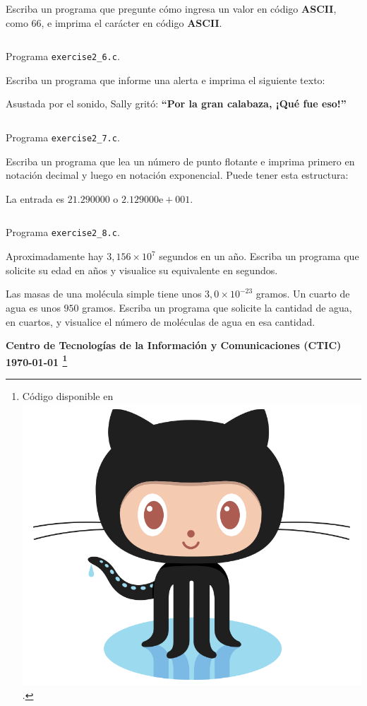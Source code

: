 \documentclass[spanish,addpoints,answers,a4paper]{exam}
\newcommand{\unmarkedfntext}[1]{%
	\begingroup
	\renewcommand\thefootnote{}\footnote{#1}%
	\addtocounter{footnote}{-1}%
	\endgroup
}
\newcommand{\mychar}{%
	\begingroup\normalfont
	\includegraphics[height=\fontcharht\font`\B]{Octocat.png}%
	\endgroup
}
\begin{document}
\begin{questions}
\question Escriba un programa que pregunte cómo ingresa un valor en código \textbf{ASCII}, como $66$, e imprima el carácter en código \textbf{ASCII}.

\begin{solution}
\begin{listing}[H]
\footnotesize
\inputminted{c}{exercise2_6.c}
\caption{Programa \texttt{exercise2\_6.c}.}
\label{lst:2.6}
\end{listing}
\end{solution}

\question Escriba un programa que informe una alerta e imprima el siguiente texto:

Asustada por el sonido, Sally gritó: \textbf{``Por la gran calabaza, ¡Qué fue eso!''}

\begin{solution}
\begin{listing}[H]
\footnotesize
\inputminted{c}{exercise2_7.c}
\caption{Programa \texttt{exercise2\_7.c}.}
\label{lst:2.7}
\end{listing}	
\end{solution}

\question Escriba un programa que lea un número de punto flotante e imprima primero en notación decimal y luego en notación exponencial. Puede tener esta estructura:

La entrada es $21.290000$ o $2.129000\text{e}+001$.

\begin{solution}
\begin{listing}[H]
\footnotesize
\inputminted{c}{exercise2_8.c}
\caption{Programa \texttt{exercise2\_8.c}.}
\label{lst:2.8}
\end{listing}	
\end{solution}

\question Aproximadamente hay $3,156\times10^{7}$ segundos en un año. Escriba un programa que solicite su edad en años y visualice su equivalente en segundos.

\begin{solution}
	
\end{solution}

\question Las masas de una molécula simple tiene unos $3,0\times10^{-23}$ gramos. Un cuarto de agua es unos $950$ gramos. Escriba un programa que solicite la cantidad de agua, en cuartos, y visualice el número de moléculas de agua en esa cantidad.

\begin{solution}
	
\end{solution}

\end{questions}

\begin{flushright}\bfseries
Centro de Tecnologías de la Información y Comunicaciones (CTIC)\\[2mm]
\today\unmarkedfntext{Código disponible en \href{https://github.com/carlosal1015/C-Programming}{\mychar{}}.}
\end{flushright}
\end{document}
